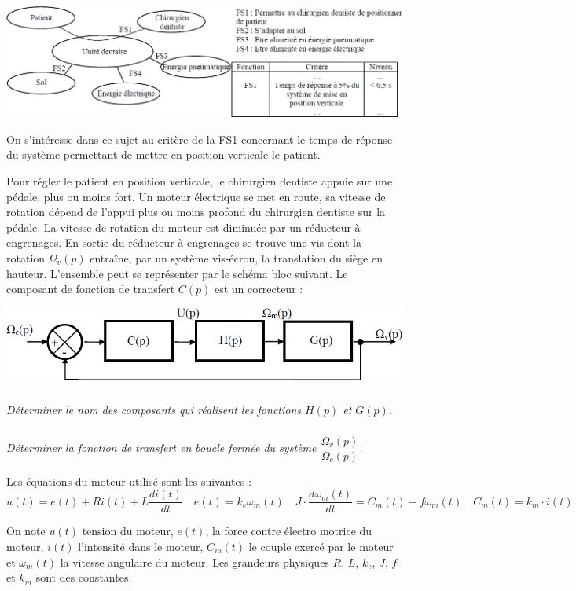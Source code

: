 \documentclass[10pt,fleqn]{article} %
\begin{document}
\begin{multicols}{2}
\begin{center}
\includegraphics[width=.9\linewidth]{images/fig4_2}
\end{center}

On s'intéresse dans ce sujet au critère de la FS1 concernant le temps de réponse du système permettant de mettre en position verticale le patient. 

Pour régler le patient en position verticale, le chirurgien dentiste appuie sur une pédale, plus ou moins fort. Un moteur électrique se met en route, sa vitesse de rotation dépend de l'appui plus ou moins profond du chirurgien dentiste sur la pédale. La vitesse de rotation du moteur est diminuée par un réducteur à engrenages. En sortie du réducteur à engrenages se trouve une vis dont la rotation $\Omega_v(p)$ entraîne, par un système vis-écrou, la translation du siège en hauteur. L'ensemble peut se représenter par le schéma bloc suivant. Le composant de fonction de transfert $C(p)$ est un correcteur :


\begin{center}
\includegraphics[width=\linewidth]{images/fig3}
\end{center}

\subparagraph{}
\textit{Déterminer le nom des composants qui réalisent les fonctions $H(p)$ et $G(p)$.}

\subparagraph{}
\textit{Déterminer la fonction de transfert en boucle fermée du système $\dfrac{\Omega_v(p)}{\Omega_c(p)}$.}

Les équations du moteur utilisé sont les suivantes :
$$
u(t)=e(t)+Ri(t)+L\dfrac{di(t)}{dt} \quad e(t) = k_e \omega_m(t) \quad J\cdot\dfrac{d\omega_m(t)}{dt} = C_m(t)-f\omega_m(t) \quad C_m(t)=k_m \cdot i(t)
$$

On note $u(t)$ tension du moteur, $e(t)$, la force contre électro motrice du moteur, $i(t)$ l'intensité dans le moteur, $C_m(t)$ le couple exercé par le moteur et $\omega_m(t)$ la vitesse angulaire du moteur. Les grandeurs physiques $R$, $L$, $k_e$, $J$, $f$ et $k_m$ sont des constantes.


\end{multicols}
\end{document}
